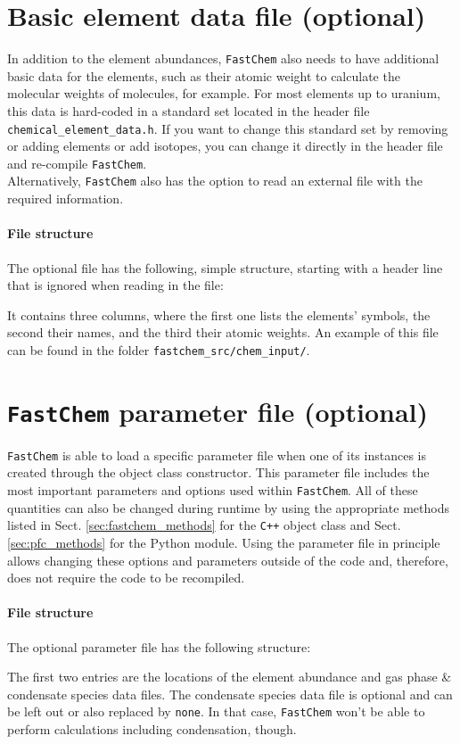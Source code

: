 \documentclass[numbers=noenddot]{aux/fcmanual}
\newcommand{\fc}{\texttt{FastChem}\xspace}
\newcommand{\cpp}{\ttt{C++}\xspace}
\newcommand{\ttt}[1]{\texttt {#1}}
\begin{document}
\newpage
\section{Basic element data file (optional)}
In addition to the element abundances, \fc also needs to have additional basic data for the elements, such as their atomic weight to calculate the molecular weights of molecules, for example. For most elements up to uranium, this data is hard-coded in a standard set located in the header file \verb|chemical_element_data.h|. If you want to change this standard set by removing or adding elements or add isotopes, you can change it directly in the header file and re-compile \fc.\\
Alternatively, \fc also has the option to read an external file with the required information.

\paragraph{File structure}
The optional file has the following, simple structure, starting with a header line that is ignored when reading in the file:

It contains three columns, where the first one lists the elements' symbols, the second their names, and the third their atomic weights. An example of this file can be found in the folder \texttt{fastchem\_src/chem\_input/}.


\section{\fc parameter file (optional)}
\label{sec:fc_parameter_file}
\fc is able to load a specific parameter file when one of its instances is created through the object class constructor. This parameter file includes the most important parameters and options used within \fc. All of these quantities can also be changed during runtime by using the appropriate methods listed in Sect. \ref{sec:fastchem_methods} for the \cpp object class and Sect. \ref{sec:pfc_methods} for the Python module. Using the parameter file in principle allows changing these options and parameters outside of the code and, therefore, does not require the code to be recompiled.

\paragraph{File structure}
The optional parameter file has the following structure:

The first two entries are the locations of the element abundance and gas phase \& condensate species data files. 
The condensate species data file is optional and can be left out or also replaced by \verb|none|. In that case, \fc won't be able to perform calculations including condensation, though.
\end{document}
